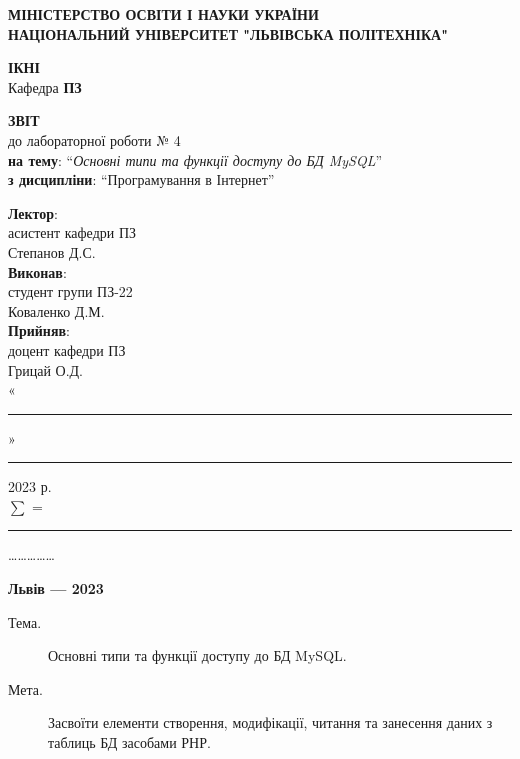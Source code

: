 \documentclass{article}
\newcommand\subject{Програмування в Інтернет}
\newcommand\lecturer{асистент кафедри ПЗ \\ Степанов Д.С.}
\newcommand\teacher{доцент кафедри ПЗ \\ Грицай О.Д.}
\newcommand\mygroup{ПЗ-22}
\newcommand\lab{4}
\newcommand\theme{Основні типи та функції доступу до БД MySQL}
\newcommand\purpose{Засвоїти елементи створення, модифікації, читання та занесення даних з таблиць БД засобами РНР}
\begin{document}
\begin{normalsize}
\begin{titlepage}
	\thispagestyle{empty}
	\begin{center}
		\textbf{МІНІСТЕРСТВО ОСВІТИ І НАУКИ УКРАЇНИ\\
			НАЦІОНАЛЬНИЙ УНІВЕРСИТЕТ "ЛЬВІВСЬКА ПОЛІТЕХНІКА"}
	\end{center}
	\begin{flushright}
		\textbf{ІКНІ}\\
		Кафедра \textbf{ПЗ}
	\end{flushright}
	\vspace{200pt}
	\begin{center}
		\textbf{ЗВІТ}\\
		\vspace{10pt}
		до лабораторної роботи № \lab\\
		\textbf{на тему}: “\textit{\theme}”\\
		\textbf{з дисципліни}: “\subject”
	\end{center}
	\vspace{112pt}
	\begin{flushright}
		
		\textbf{Лектор}:\\
		\lecturer\\
		\vspace{28pt}
		\textbf{Виконав}:\\
		
		студент групи \mygroup\\
		Коваленко Д.М.\\
		\vspace{28pt}
		\textbf{Прийняв}:\\
		
		\teacher\\
		
		\vspace{28pt}
		«\rule{1cm}{0.15mm}» \rule{1.5cm}{0.15mm} 2023 р.\\
		$\sum$ = \rule{1cm}{0.15mm}……………\\
		
	\end{flushright}
	\vspace{\fill}
	\begin{center}
		\textbf{Львів — 2023}
	\end{center}
\end{titlepage}
	
\begin{description}
	\item[Тема.] \theme.
	\item[Мета.] \purpose.
\end{description}


\end{normalsize}
\end{document}
